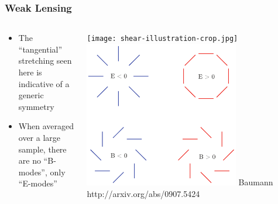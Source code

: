 \documentclass{beamer}
\begin{document}
\frame
{

    \frametitle{Weak Lensing}

    \fontsize{10}{0.8\baselineskip}

    \begin{columns}

        \begin{column}{0.5\textwidth}

            \begin{itemize}

                \item The ``tangential'' stretching seen here is indicative
                of a generic symmetry

                \item When averaged over a large sample, there are no ``B-modes'',
                    only ``E-modes''


            \end{itemize}
        \end{column}
        \begin{column}{0.5\textwidth}
            \begin{center}
                \texttt{[image: shear-illustration-crop.jpg]}
                \newline
                \includegraphics[width=0.7\textwidth]{EBmode.pdf}
                \newline
                {\tiny Baumann http://arxiv.org/abs/0907.5424}
            \end{center}
        \end{column}
    \end{columns}
}
\end{document}
